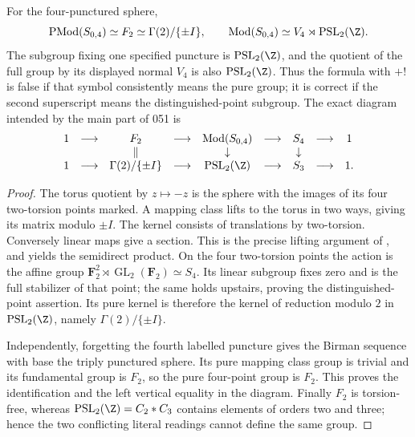 \begin{proposition}\label{A6-four-punctures}
For the four-punctured sphere,
\[
 \operatorname{PMod}(S_{0,4})\simeq F_2
 \simeq \Gamma(2)/\{\pm I\},
 \qquad
 \operatorname{Mod}(S_{0,4})
 \simeq V_4\rtimes\operatorname{PSL}_2(\Z).
\]
The subgroup fixing one specified puncture is $\operatorname{PSL}_2(\Z)$, and the quotient of the full group by its displayed normal $V_4$ is also $\operatorname{PSL}_2(\Z)$. Thus the formula with $+!$ is false if that symbol consistently means the pure group; it is correct if the second superscript means the distinguished-point subgroup. The exact diagram intended by the main part of 051 is
\[
 \begin{array}{ccccccccc}
 1&\longrightarrow&F_2&\longrightarrow&
 \operatorname{Mod}(S_{0,4})&\longrightarrow&S_4&\longrightarrow&1\\
 &&\Vert&&\downarrow&&\downarrow\\
 1&\longrightarrow&\Gamma(2)/\{\pm I\}&\longrightarrow&
 \operatorname{PSL}_2(\Z)&\longrightarrow&S_3&\longrightarrow&1 .
 \end{array}
\]
\end{proposition}
\begin{proof}
The torus quotient by $z\mapsto-z$ is the sphere with the images of its four two-torsion points marked. A mapping class lifts to the torus in two ways, giving its matrix modulo $\pm I$. The kernel consists of translations by two-torsion. Conversely linear maps give a section. This is the precise lifting argument of \cite[Proposition 2.7]{FarbMargalit2012A567}, and yields the semidirect product. On the four two-torsion points the action is the affine group
$\mathbf F_2^2\rtimes\operatorname{GL}_2(\mathbf F_2)\simeq S_4$.
Its linear subgroup fixes zero and is the full stabilizer of that point; the same holds upstairs, proving the distinguished-point assertion. Its pure kernel is therefore the kernel of reduction modulo $2$ in $\operatorname{PSL}_2(\Z)$, namely $\Gamma(2)/\{\pm I\}$.

Independently, forgetting the fourth labelled puncture gives the Birman sequence with base the triply punctured sphere. Its pure mapping class group is trivial and its fundamental group is $F_2$, so the pure four-point group is $F_2$. This proves the identification and the left vertical equality in the diagram. Finally $F_2$ is torsion-free, whereas $\operatorname{PSL}_2(\Z)=C_2*C_3$ contains elements of orders two and three; hence the two conflicting literal readings cannot define the same group.
\end{proof}

